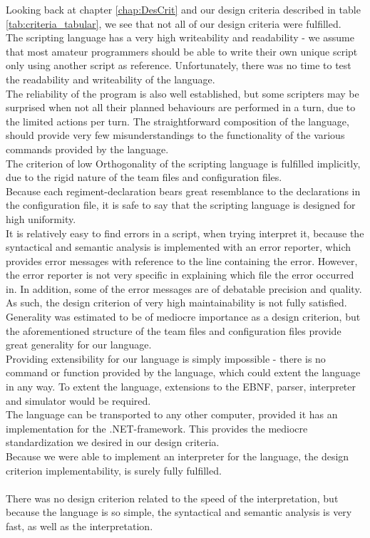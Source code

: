 	Looking back at chapter \ref{chap:DesCrit} and our design criteria described in table \ref{tab:criteria_tabular}, we see that not all of our design criteria were fulfilled. \\
	The scripting language has a very high writeability and readability - we assume that most amateur programmers should be able to write their own unique script only using another script as reference. Unfortunately, there was no time to test the readability and writeability of the language. \\
	The reliability of the program is also well established, but some scripters may be surprised when not all their planned behaviours are performed in a turn, due to the limited actions per turn. The straightforward composition of the language, should provide very few misunderstandings to the functionality of the various commands provided by the language.\\
	The criterion of low Orthogonality of the scripting language is fulfilled implicitly, due to the rigid nature of the team files and configuration files.\\ 
	Because each regiment-declaration bears great resemblance to the declarations in the configuration file, it is safe to say that the scripting language is designed for high uniformity. \\
	It is relatively easy to find errors in a script, when trying interpret it, because the syntactical and semantic analysis is implemented with an error reporter, which provides error messages with reference to the line containing the error. However, the error reporter is not very specific in explaining which file the error occurred in. In addition, some of the error messages are of debatable precision and quality. As such, the design criterion of very high maintainability is not fully satisfied.\\
	Generality was estimated to be of mediocre importance as a design criterion, but the aforementioned structure of the team files and configuration files provide great generality for our language.\\
	Providing extensibility for our language is simply impossible - there is no command or function provided by the language, which could extent the language in any way. To extent the language, extensions to the EBNF, parser, interpreter and simulator would be required. \\
	The language can be transported to any other computer, provided it has an implementation for the .NET-framework. This provides the mediocre standardization we desired in our design criteria.\\
	Because we were able to implement an interpreter for the language, the design criterion implementability, is surely fully fulfilled.\\
	\\
	
	There was no design criterion related to the speed of the interpretation, but because the language is so simple, the syntactical and semantic analysis is very fast, as well as the interpretation.